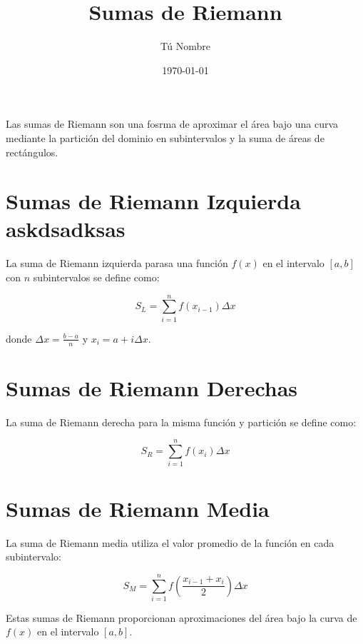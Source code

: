\documentclass{article}
\begin{document}
\title{Sumas de Riemann}
\author{Tú Nombre}
\date{\today}
\maketitle

Las sumas de Riemann son una fosrma de aproximar el área bajo una curva mediante la partición del dominio en subintervalos y la suma de áreas de rectángulos.

\section{Sumas de Riemann Izquierda askdsadksas}

La suma de Riemann izquierda parasa una función $f(x)$ en el intervalo $[a, b]$ con $n$ subintervalos se define como:

\[
S_L = \sum_{i=1}^{n} f(x_{i-1}) \Delta x
\]

donde $\Delta x = \frac{b-a}{n}$ y $x_i = a + i \Delta x$.

\section{Sumas de Riemann Derechas}

La suma de Riemann derecha para la misma función y partición se define como:

\[
S_R = \sum_{i=1}^{n} f(x_i) \Delta x
\]

\section{Sumas de Riemann Media}

La suma de Riemann media utiliza el valor promedio de la función en cada subintervalo:

\[
S_M = \sum_{i=1}^{n} f\left(\frac{x_{i-1}+x_i}{2}\right) \Delta x
\]

Estas sumas de Riemann proporcionan aproximaciones del área bajo la curva de $f(x)$ en el intervalo $[a, b]$.
\end{document}
